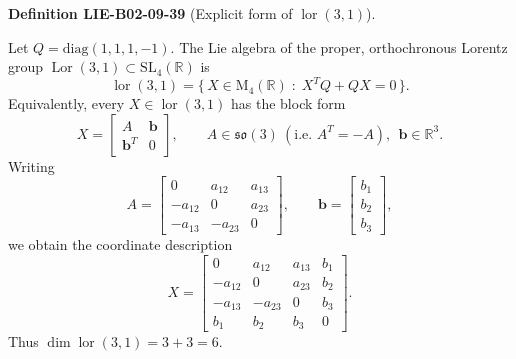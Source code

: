 \documentclass[10pt, letterpaper]{article}
\newcommand{\CustomHeading}[3]{%
  \par\medskip\noindent%
  \textbf{#1 #2} \textnormal{(#3)}.\enskip%
}
\newenvironment{DEF}[2]{\begin{unitbox}\CustomHeading{Definition}{#1}{#2}}{\end{unitbox}}
\begin{document}
\begin{DEF}{LIE-B02-09-39}{Explicit form of \(\operatorname{lor}(3,1)\)}
Let \(Q=\mathrm{diag}(1,1,1,-1)\). The Lie algebra of the proper,
orthochronous Lorentz group \(\operatorname{Lor}(3,1)\subset \mathrm{SL}_4(\mathbb{R})\) is
\[
\operatorname{lor}(3,1)
=\bigl\{\,X\in \mathrm{M}_4(\mathbb{R})\;:\; X^T Q+QX=0\,\bigr\}.
\]
Equivalently, every \(X\in \operatorname{lor}(3,1)\) has the block form
\[
X=
\begin{bmatrix}
A & \mathbf{b}\\[2pt]
\mathbf{b}^{\!T} & 0
\end{bmatrix},
\qquad
A\in\mathfrak{so}(3)\ (\text{i.e. }A^T=-A),\ \ \mathbf{b}\in\mathbb{R}^{3}.
\]
Writing
\[
A=
\begin{bmatrix}
0 & a_{12} & a_{13}\\
-a_{12} & 0 & a_{23}\\
-a_{13} & -a_{23} & 0
\end{bmatrix},
\qquad
\mathbf{b}=
\begin{bmatrix} b_1\\ b_2\\ b_3\end{bmatrix},
\]
we obtain the coordinate description
\[
X=
\begin{bmatrix}
0 & a_{12} & a_{13} & b_1\\
-a_{12} & 0 & a_{23} & b_2\\
-a_{13} & -a_{23} & 0 & b_3\\
b_1 & b_2 & b_3 & 0
\end{bmatrix}.
\]
Thus \(\dim\operatorname{lor}(3,1)=3+3=6\).
\end{DEF}
\end{document}
